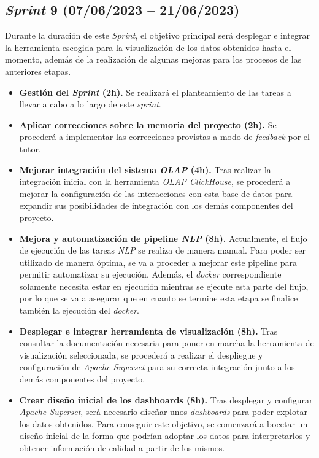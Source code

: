 

\subsection{\textit{Sprint} 9 (07/06/2023 -- 21/06/2023)}

Durante la duración de este \textit{Sprint}, el objetivo principal será desplegar e integrar la herramienta escogida para la visualización de los datos obtenidos hasta el momento, además de la realización de algunas mejoras para los procesos de las anteriores etapas.

\begin{itemize}

    \item \textbf{Gestión del \textit{Sprint} (2h).} Se realizará el planteamiento de las tareas a llevar a cabo a lo largo de este \textit{sprint}.

    \item \textbf{Aplicar correcciones sobre la memoria del proyecto (2h).} Se procederá a implementar las correcciones provistas a modo de \textit{feedback} por el tutor.

    \item \textbf{Mejorar integración del sistema \textit{OLAP} (4h).} Tras realizar la integración inicial con la herramienta \textit{OLAP ClickHouse}, se procederá a mejorar la configuración de las interacciones con esta base de datos para expandir sus posibilidades de integración con los demás componentes del proyecto.

    \item \textbf{Mejora y automatización de pipeline \textit{NLP} (8h).} Actualmente, el flujo de ejecución de las tareas \textit{NLP} se realiza de manera manual. Para poder ser utilizado de manera óptima, se va a proceder a mejorar este pipeline para permitir automatizar su ejecución. Además, el \textit{docker} correspondiente solamente necesita estar en ejecución mientras se ejecute esta parte del flujo, por lo que se va a asegurar que en cuanto se termine esta etapa se finalice también la ejecución del \textit{docker}.

    \item \textbf{Desplegar e integrar herramienta de visualización (8h).} Tras consultar la documentación necesaria para poner en marcha la herramienta de visualización seleccionada, se procederá a realizar el despliegue y configuración de \textit{Apache Superset} para su correcta integración junto a los demás componentes del proyecto.

    \item \textbf{Crear diseño inicial de los dashboards (8h).} Tras desplegar y configurar \textit{Apache Superset}, será necesario diseñar unos \textit{dashboards} para poder explotar los datos obtenidos. Para conseguir este objetivo, se comenzará a bocetar un diseño inicial de la forma que podrían adoptar los datos para interpretarlos y obtener información de calidad a partir de los mismos.

\end{itemize}


